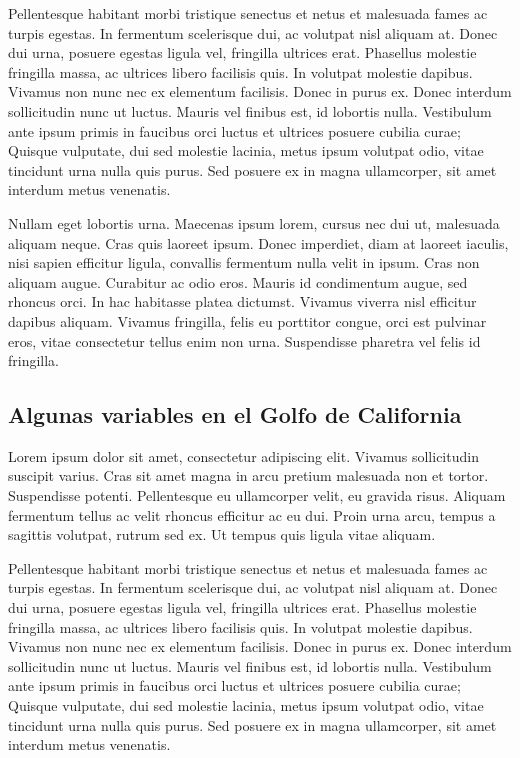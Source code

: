 \documentclass[
]{article}
\begin{document}
Pellentesque habitant morbi tristique senectus et netus et malesuada fames ac turpis egestas. In fermentum scelerisque dui, ac volutpat nisl aliquam at. Donec dui urna, posuere egestas ligula vel, fringilla ultrices erat. Phasellus molestie fringilla massa, ac ultrices libero facilisis quis. In volutpat molestie dapibus. Vivamus non nunc nec ex elementum facilisis. Donec in purus ex. Donec interdum sollicitudin nunc ut luctus. Mauris vel finibus est, id lobortis nulla. Vestibulum ante ipsum primis in faucibus orci luctus et ultrices posuere cubilia curae; Quisque vulputate, dui sed molestie lacinia, metus ipsum volutpat odio, vitae tincidunt urna nulla quis purus. Sed posuere ex in magna ullamcorper, sit amet interdum metus venenatis.

Nullam eget lobortis urna. Maecenas ipsum lorem, cursus nec dui ut, malesuada aliquam neque. Cras quis laoreet ipsum. Donec imperdiet, diam at laoreet iaculis, nisi sapien efficitur ligula, convallis fermentum nulla velit in ipsum. Cras non aliquam augue. Curabitur ac odio eros. Mauris id condimentum augue, sed rhoncus orci. In hac habitasse platea dictumst. Vivamus viverra nisl efficitur dapibus aliquam. Vivamus fringilla, felis eu porttitor congue, orci est pulvinar eros, vitae consectetur tellus enim non urna. Suspendisse pharetra vel felis id fringilla.

\hypertarget{algunas-variables-en-el-golfo-de-california}{%
\subsection{Algunas variables en el Golfo de California}\label{algunas-variables-en-el-golfo-de-california}}

Lorem ipsum dolor sit amet, consectetur adipiscing elit. Vivamus sollicitudin suscipit varius. Cras sit amet magna in arcu pretium malesuada non et tortor. Suspendisse potenti. Pellentesque eu ullamcorper velit, eu gravida risus. Aliquam fermentum tellus ac velit rhoncus efficitur ac eu dui. Proin urna arcu, tempus a sagittis volutpat, rutrum sed ex. Ut tempus quis ligula vitae aliquam.

Pellentesque habitant morbi tristique senectus et netus et malesuada fames ac turpis egestas. In fermentum scelerisque dui, ac volutpat nisl aliquam at. Donec dui urna, posuere egestas ligula vel, fringilla ultrices erat. Phasellus molestie fringilla massa, ac ultrices libero facilisis quis. In volutpat molestie dapibus. Vivamus non nunc nec ex elementum facilisis. Donec in purus ex. Donec interdum sollicitudin nunc ut luctus. Mauris vel finibus est, id lobortis nulla. Vestibulum ante ipsum primis in faucibus orci luctus et ultrices posuere cubilia curae; Quisque vulputate, dui sed molestie lacinia, metus ipsum volutpat odio, vitae tincidunt urna nulla quis purus. Sed posuere ex in magna ullamcorper, sit amet interdum metus venenatis.
\end{document}
